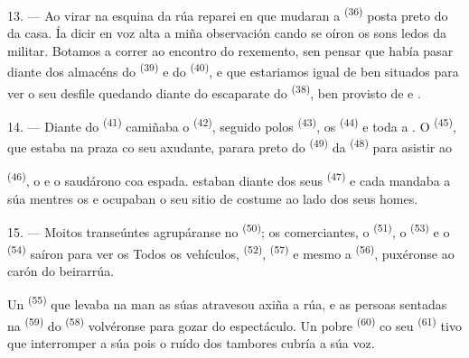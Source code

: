 13. --- Ao virar na esquina da rúa reparei en que mudaran a 
\textsuperscript{(36)} posta preto do  da casa. Ía dicir en voz alta a
miña observación cando se oíron os sons ledos da  militar. Botamos a
correr ao encontro do rexemento, sen pensar que  había pasar diante dos
almacéns do  \textsuperscript{(39)} e do 
\textsuperscript{(40)}, e que estariamos igual de ben situados para ver o seu desfile
quedando diante do escaparate do  \textsuperscript{(38)}, ben
provisto de  e .

\VUsaut{3.0mm}

14. --- Diante do  \textsuperscript{(41)} camiñaba o
 \textsuperscript{(42)}, seguido polos 
\textsuperscript{(43)}, os  \textsuperscript{(44)} e toda a
. O  \textsuperscript{(45)}, que estaba na
praza co seu axudante, parara preto do 
\textsuperscript{(49)} da  \textsuperscript{(48)} para asistir ao

 \textsuperscript{(46)}, o  e o
 saudárono coa espada.  estaban diante
dos seus  \textsuperscript{(47)} e cada  mandaba a
súa  mentres os   e
 ocupaban o seu sitio de costume ao lado dos seus homes.

15. --- Moitos transeúntes agrupáranse no 
\textsuperscript{(50)}; os comerciantes, o  \textsuperscript{(51)},
o  \textsuperscript{(53)} e o 
\textsuperscript{(54)} saíron para ver os  Todos os vehículos,
 \textsuperscript{(52)}, 
\textsuperscript{(57)} e mesmo a  \textsuperscript{(56)},
puxéronse ao carón do beirarrúa.

\VUsaut{3.0mm}

Un  \textsuperscript{(55)} que levaba na man as súas
 atravesou axiña a rúa, e as persoas sentadas na
 \textsuperscript{(59)} do  \textsuperscript{(58)}
volvéronse para gozar do espectáculo. Un pobre 
\textsuperscript{(60)} co seu  \textsuperscript{(61)} tivo que
interromper a súa  pois o ruído dos tambores cubría a súa voz.


